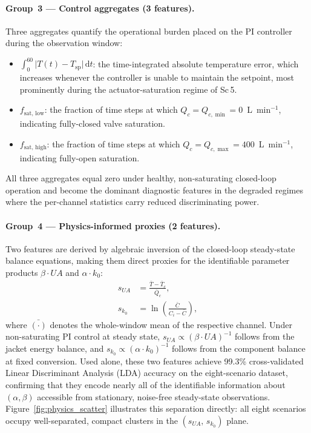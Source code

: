 \documentclass[aps,pre,twocolumn,superscriptaddress]{revtex4-2}
\begin{document}
\paragraph{Group~3 --- Control aggregates (3 features).}
Three aggregates quantify the operational burden placed on the PI
controller during the observation window:
%
\begin{itemize}
  \item $\int_0^{60}\lvert T(t)-T_\mathrm{sp}\rvert\,\mathrm{d}t$: the
    time-integrated absolute temperature error, which increases whenever
    the controller is unable to maintain the setpoint, most prominently
    during the actuator-saturation regime of Sc\,5.
  \item $f_\mathrm{sat,\,low}$: the fraction of time steps at which
    $Q_c = Q_{c,\min} = 0$~L~min$^{-1}$, indicating fully-closed valve
    saturation.
  \item $f_\mathrm{sat,\,high}$: the fraction of time steps at which
    $Q_c = Q_{c,\max} = 400$~L~min$^{-1}$, indicating fully-open
    saturation.
\end{itemize}
%
All three aggregates equal zero under healthy, non-saturating closed-loop
operation and become the dominant diagnostic features in the degraded
regimes where the per-channel statistics carry reduced discriminating power.

\paragraph{Group~4 --- Physics-informed proxies (2 features).}
Two features are derived by algebraic inversion of the closed-loop
steady-state balance equations, making them direct proxies for the
identifiable parameter products $\beta\!\cdot\!U\!A$ and
$\alpha\!\cdot\!k_0$:
%
\begin{align}
  s_{U\!A} &= \frac{\bar{T}-\bar{T}_c}{\bar{Q}_c},
  \label{eq:ua_proxy}\\[4pt]
  s_{k_0} &= \ln\!\left(\frac{\bar{C}}{C_i - \bar{C}}\right),
  \label{eq:k0_proxy}
\end{align}
%
where $\bar{(\cdot)}$ denotes the whole-window mean of the respective
channel.  Under non-saturating PI control at steady state,
$s_{U\!A}\propto(\beta\!\cdot\!U\!A)^{-1}$ follows from the jacket energy
balance, and $s_{k_0}\propto(\alpha\!\cdot\!k_0)^{-1}$ follows from the
component balance at fixed conversion.  Used alone, these two features
achieve 99.3\% cross-validated Linear Discriminant Analysis (LDA) \citep{Zhou2021}
accuracy on the eight-scenario dataset, confirming that they encode nearly all of the identifiable
information about $(\alpha,\beta)$ accessible from stationary, noise-free
steady-state observations.  Figure~\ref{fig:physics_scatter} illustrates
this separation directly: all eight scenarios occupy well-separated,
compact clusters in the $(s_{U\!A},\,s_{k_0})$ plane.
\end{document}
